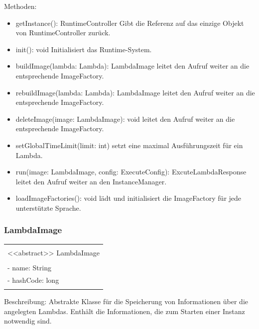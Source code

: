 \documentclass[a4paper,20pt,oneside]{book}
\begin{document}
	Methoden:
	\begin{itemize}
	\item getInstance(): RuntimeController
	\linebreak Gibt die Referenz auf das einzige Objekt von RuntimeController zurück.
	\item init(): void
	\linebreak Initialisiert das Runtime-System.
	\item buildImage(lambda: Lambda): LambdaImage
	\linebreak leitet den Aufruf weiter an die entsprechende ImageFactory.
	\item rebuildImage(lambda: Lambda): LambdaImage
	\linebreak leitet den Aufruf weiter an die entsprechende ImageFactory.
	\item deleteImage(image: LambdaImage): void
	\linebreak leitet den Aufruf weiter an die entsprechende ImageFactory.
	\item setGlobalTimeLimit(limit: int)
	\linebreak setzt eine maximal Ausführungszeit für ein Lambda.
	\item run(image: LambdaImage, config: ExecuteConfig): ExcuteLambdaResponse
	\linebreak leitet den Aufruf weiter an den InstanceManager.
	\item loadImageFactories(): void
	\linebreak lädt und initialisiert die ImageFactory für jede unterstützte Sprache.
	\end{itemize}			
	
	\subsubsection{LambdaImage}
	\centering
	\begin{tabular}{|l|}
	\hline \\
	<<abstract>> LambdaImage \\
	\hline \\
	- name: String \\
	- hashCode: long \\
	\hline \\
	\hline 
	\end{tabular}
	
	\raggedright
	\vspace{0.5cm}	
	
	Beschreibung: 
	\linebreak Abstrakte Klasse für die Speicherung von Informationen über die angelegten Lambdas. Enthält die Informationen, die zum Starten einer Instanz notwendig sind.
	\vspace{0.5cm}
	
\end{document}
